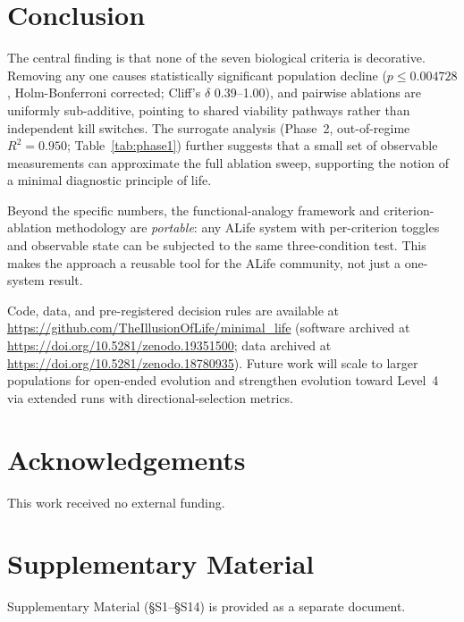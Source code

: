 \documentclass[letterpaper]{article}
\begin{document}
\section{Conclusion}

The central finding is that none of the seven biological criteria is decorative.
Removing any one causes statistically significant population decline
($p \leq 0.004728$, Holm-Bonferroni corrected; Cliff's $\delta$ 0.39--1.00),
and pairwise ablations are uniformly sub-additive, pointing to shared
viability pathways rather than independent kill switches.
The surrogate analysis (Phase~2, out-of-regime $R^2 = 0.950$;
Table~\ref{tab:phase1}) further suggests that a small set of observable
measurements can approximate the full ablation sweep, supporting the notion
of a minimal diagnostic principle of life.

Beyond the specific numbers, the functional-analogy framework and
criterion-ablation methodology are \emph{portable}: any ALife system
with per-criterion toggles and observable state can be subjected to the
same three-condition test. This makes the approach a reusable tool for
the ALife community, not just a one-system result.

Code, data, and pre-registered decision rules are available at
\url{https://github.com/TheIllusionOfLife/minimal_life}
(software archived at \url{https://doi.org/10.5281/zenodo.19351500};
data archived at \url{https://doi.org/10.5281/zenodo.18780935}).
Future work will scale to larger populations for open-ended evolution
\citep{bedau_2000_open,taylor_2016_openended,packard_2019_overview} and strengthen evolution toward
Level~4 via extended runs with directional-selection metrics.

\section{Acknowledgements}
This work received no external funding.

\section*{Supplementary Material}
Supplementary Material (§S1--§S14) is provided as a separate document.



\end{document}
